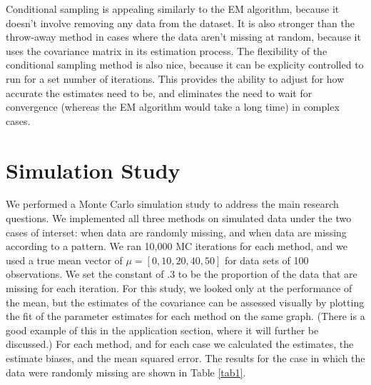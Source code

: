 \documentclass{svproc}
\begin{document}
Conditional sampling is appealing similarly to the EM algorithm, because it doesn't involve removing any data from the dataset. It is also stronger than the throw-away method in cases where the data aren't missing at random, because it uses the covariance matrix in its estimation process. The flexibility of the conditional sampling method is also nice, because it can be explicity controlled to run for a set number of iterations. This provides the ability to adjust for how accurate the estimates need to be, and eliminates the need to wait for convergence (whereas the EM algorithm would take a long time) in complex cases.


\section{Simulation Study}
We performed a Monte Carlo simulation study to address the main research questions. We implemented all three methods on simulated data under the two cases of interset: when data are randomly missing, and when data are missing according to a pattern. We ran 10,000 MC iterations for each method, and we used a true mean vector of $\mu = [0,10,20,40,50]$ for data sets of 100 observations. We set the constant of .3 to be the proportion of the data that are missing for each iteration.  For this study, we looked only at the performance of the mean, but the estimates of the covariance can be assessed visually by plotting the fit of the parameter estimates for each method on the same graph. (There is a good example of this in the application section, where it will further be discussed.) For each method, and for each case we calculated the estimates, the estimate biases, and the mean squared error. The results for the case in which the data were randomly missing are shown in Table \ref{tab1}. 
\end{document}
